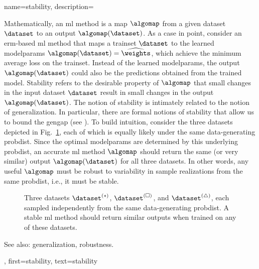 {name={stability},
	description={Mathematically, an \gls{ml} method is a \gls{map} $\algomap$ from a given \gls{dataset} $\dataset$ 
		to an \gls{output} $\algomap(\dataset)$. As a case in point, consider an \gls{erm}-based 
		\gls{ml} method that maps a \gls{trainset} $\dataset$ to the learned \glspl{modelparam} 
		$\algomap(\dataset) = \widehat{\weights}$, which achieve the \gls{minimum} average \gls{loss} 
		on the \gls{trainset}. Instead of the learned \glspl{modelparam}, the 
		\gls{output} $\algomap(\dataset)$ could also be the \glspl{prediction} obtained from 
		the trained \gls{model}. Stability refers to the desirable property 
		of $\algomap$ that small changes in the input \gls{dataset} $\dataset$ result in small 
		changes in the \gls{output} $\algomap(\dataset)$. The notion of stability is intimately related 
		to the notion of \gls{generalization}. In particular, there are formal notions of stability  
		that allow us to bound the \gls{gengap} (see \cite[Ch.~13]{ShalevMLBook}).
		To build intuition, consider the three \glspl{dataset} depicted in Fig.\ \ref{fig_three_data_stability_dict}, each 
		of which is equally likely under the same \gls{data}-generating \gls{probdist}. Since the 
		optimal \glspl{modelparam} are determined by this underlying \gls{probdist}, an accurate 
		\gls{ml} method $\algomap$ should return the same (or very similar) \gls{output} $\algomap(\dataset)$ 
		for all three \glspl{dataset}. In other words, any useful $\algomap$ must be robust to 
		variability in \gls{sample} \glspl{realization} from the same \gls{probdist}, i.e., it must be stable. 
		\begin{figure}[H]
			\centering
		\caption{Three \glspl{dataset} $\dataset^{(*)}$, $\dataset^{(\square)}$, 
			and $\dataset^{(\triangle)}$, each sampled independently from the same 
			\gls{data}-generating \gls{probdist}. A stable \gls{ml} method should return 
			similar \glspl{output} when trained on any of these \glspl{dataset}. \label{fig_three_data_stability_dict}}
		\end{figure}
		See also: \gls{generalization}, \gls{robustness}.}, 
	first={stability}, 
	text={stability} 
}

